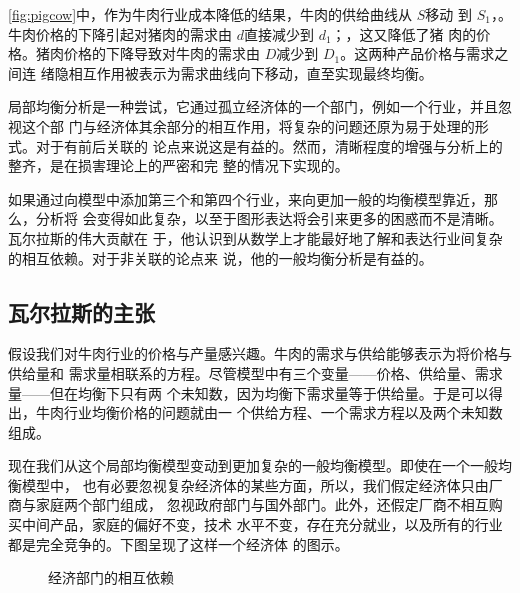 \cref{fig:pigcow}中，作为牛肉行业成本降低的结果，牛肉的供给曲线从 $S$移动
到 $S_1$，。牛肉价格的下降引起对猪肉的需求由 $d$直接减少到 $d_1$；，这又降低了猪
肉的价格。猪肉价格的下降导致对牛肉的需求由 $D$减少到 $D_1$。这两种产品价格与需求之间连
绪隐相互作用被表示为需求曲线向下移动，直至实现最终均衡。

局部均衡分析是一种尝试，它通过孤立经济体的一个部门，例如一个行业，并且忽视这个部
门与经济体其余部分的相互作用，将复杂的问题还原为易于处理的形式。对于有前后关联的
论点来说这是有益的。然而，清晰程度的增强与分析上的整齐，是在损害理论上的严密和完
整的情况下实现的。

如果通过向模型中添加第三个和第四个行业，来向更加一般的均衡模型靠近，那么，分析将
会变得如此复杂，以至于图形表达将会引来更多的困惑而不是清晰。瓦尔拉斯的伟大贡献在
于，他认识到从数学上才能最好地了解和表达行业间复杂的相互依赖。对于非关联的论点来
说，他的一般均衡分析是有益的。

\subsection{瓦尔拉斯的主张}

假设我们对牛肉行业的价格与产量感兴趣。牛肉的需求与供给能够表示为将价格与供给量和
需求量相联系的方程。尽管模型中有三个变量——价格、供给量、需求量——但在均衡下只有两
个未知数，因为均衡下需求量等于供给量。于是可以得出，牛肉行业均衡价格的问题就由一
个供给方程、一个需求方程以及两个未知数组成。

现在我们从这个局部均衡模型变动到更加复杂的一般均衡模型。即使在一个一般均衡模型中，
也有必要忽视复杂经济体的某些方面，所以，我们假定经济体只由厂商与家庭两个部门组成，
忽视政府部门与国外部门。此外，还假定厂商不相互购买中间产品，家庭的偏好不变，技术
水平不变，存在充分就业，以及所有的行业都是完全竞争的。下图呈现了这样一个经济体
的图示。
\begin{figure}[ht]
  \centering
  \caption{\label{fig:interdepend}经济部门的相互依赖}
\end{figure}

